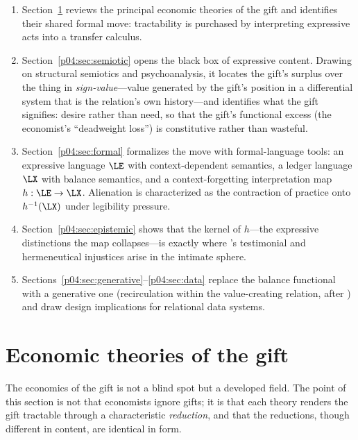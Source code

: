 \begin{enumerate}[label=(\roman*)]
  \item Section~\ref{p04:sec:econ} reviews the principal economic theories of the
  gift and identifies their shared formal move: tractability is purchased by
  interpreting expressive acts into a transfer calculus.
  \item Section~\ref{p04:sec:semiotic} opens the black box of expressive content.
  Drawing on structural semiotics and psychoanalysis, it locates the gift's
  surplus over the thing in \emph{sign-value}---value generated by the gift's
  position in a differential system that is the relation's own history---and
  identifies what the gift signifies: desire rather than need, so that the
  gift's functional excess (the economist's ``deadweight loss'') is
  constitutive rather than wasteful.
  \item Section~\ref{p04:sec:formal} formalizes the move with formal-language
  tools: an expressive language $\LE$ with context-dependent semantics, a
  ledger language $\LX$ with balance semantics, and a context-forgetting
  interpretation map $h:\LE\to\LX$. Alienation is characterized as the
  contraction of practice onto $h^{-1}(\LX)$ under legibility pressure.
  \item Section~\ref{p04:sec:epistemic} shows that the kernel of $h$---the
  expressive distinctions the map collapses---is exactly where
  \textcite{fricker2007}'s testimonial and hermeneutical injustices arise in the
  intimate sphere.
  \item Sections~\ref{p04:sec:generative}--\ref{p04:sec:data} replace the balance
  functional with a generative one (recirculation within the value-creating
  relation, after \cite{eglash2016}) and draw design implications for
  relational data systems.
\end{enumerate}

\section{Economic theories of the gift}
\label{p04:sec:econ}

The economics of the gift is not a blind spot but a developed field. The
point of this section is not that economists ignore gifts; it is that each
theory renders the gift tractable through a characteristic \emph{reduction},
and that the reductions, though different in content, are identical in form.

